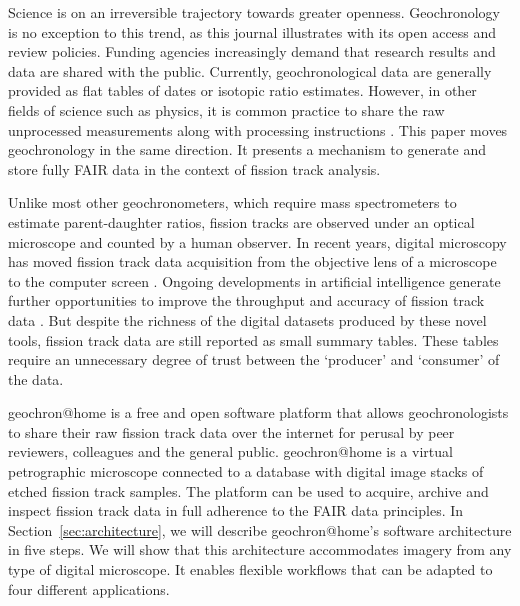 \documentclass[gchron, manuscript]{copernicus}
\begin{document}
\introduction\label{sec:intro}

Science is on an irreversible trajectory towards greater
openness. Geochronology is no exception to this trend, as this journal
illustrates with its open access and review policies. Funding agencies
increasingly demand that research results and data are shared with the
public. Currently, geochronological data are generally provided as
flat tables of dates or isotopic ratio estimates. However, in other
fields of science such as physics, it is common practice to share the
raw unprocessed measurements along with processing instructions
\citep[e.g.,][]{abbott2016}. This paper moves geochronology in the
same direction. It presents a mechanism to generate and store fully
FAIR \citep[Findable, Accessible, Interoperable and
  Reproducible;][]{wilkinson2016} data in the context of fission track
analysis.\medskip

Unlike most other geochronometers, which require mass spectrometers to
estimate parent-daughter ratios, fission tracks are observed under an
optical microscope and counted by a human observer.  In recent years,
digital microscopy has moved fission track data acquisition from the
objective lens of a microscope to the computer screen
\citep{gleadow2009, vanranst2019, gleadow2019}. Ongoing developments
in artificial intelligence generate further opportunities to improve
the throughput and accuracy of fission track data
\citep{nachtergaele2020}. But despite the richness of the digital
datasets produced by these novel tools, fission track data are still
reported as small summary tables. These tables require an unnecessary
degree of trust between the `producer' and `consumer' of the
data.\medskip

geochron@home is a free and open software platform that allows
geochronologists to share their raw fission track data over the
internet for perusal by peer reviewers, colleagues and the general
public. geochron@home is a virtual petrographic microscope connected to a
database with digital image stacks of etched fission track
samples. The platform can be used to acquire, archive and inspect
fission track data in full adherence to the FAIR data principles. In
Section~\ref{sec:architecture}, we will describe geochron@home's software
architecture in five steps. We will show that this architecture
accommodates imagery from any type of digital microscope. It enables
flexible workflows that can be adapted to four different
applications.\medskip
\end{document}
